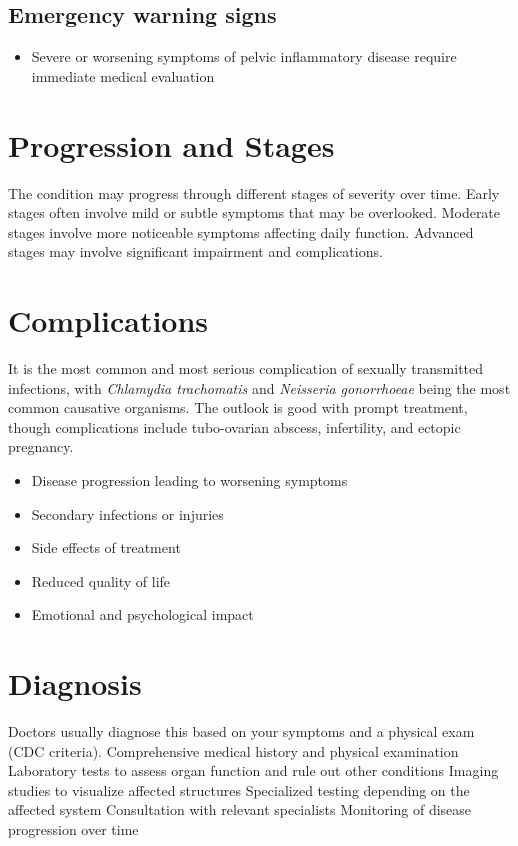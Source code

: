 \subsection{Emergency warning signs}
\begin{itemize}[noitemsep]
  \item Severe or worsening symptoms of pelvic inflammatory disease require immediate medical evaluation
\end{itemize}
\section{Progression and Stages}
The condition may progress through different stages of severity over time. Early stages often involve mild or subtle symptoms that may be overlooked. Moderate stages involve more noticeable symptoms affecting daily function. Advanced stages may involve significant impairment and complications.
\section{Complications}
It is the most common and most serious complication of sexually transmitted infections, with \textit{Chlamydia trachomatis} and \textit{Neisseria gonorrhoeae} being the most common causative organisms. The outlook is good with prompt treatment, though complications include tubo-ovarian abscess, infertility, and ectopic pregnancy.

\begin{itemize}[noitemsep]
  \item Disease progression leading to worsening symptoms
  \item Secondary infections or injuries
  \item Side effects of treatment
  \item Reduced quality of life
  \item Emotional and psychological impact
\end{itemize}
\section{Diagnosis}
Doctors usually diagnose this based on your symptoms and a physical exam (CDC criteria). Comprehensive medical history and physical examination Laboratory tests to assess organ function and rule out other conditions Imaging studies to visualize affected structures Specialized testing depending on the affected system Consultation with relevant specialists Monitoring of disease progression over time

